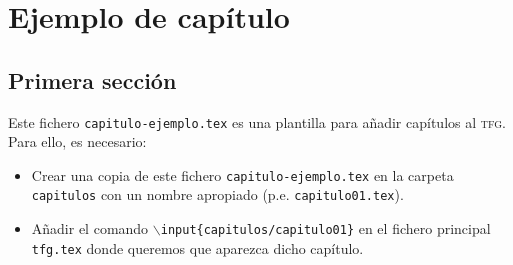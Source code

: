 
\chapter{Ejemplo de capítulo}

\section{Primera sección}

Este fichero \texttt{capitulo-ejemplo.tex} es una plantilla para añadir capítulos al \textsc{tfg}. Para ello, es necesario:
\begin{itemize}
    \item Crear una copia de este fichero \texttt{capitulo-ejemplo.tex} en la carpeta \texttt{capitulos} con un nombre apropiado (p.e. \texttt{capitulo01.tex}).
    \item Añadir el comando \texttt{$\backslash$input\{capitulos/capitulo01\}} en el fichero principal \texttt{tfg.tex} donde queremos que aparezca dicho capítulo.
\end{itemize}


\endinput
